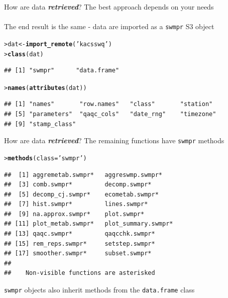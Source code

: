 \documentclass[serif]{beamer}\usepackage[]{graphicx}\usepackage[]{color}
\makeatletter
\newcommand{\hlstr}[1]{\textcolor[rgb]{0.192,0.494,0.8}{#1}}%
\newcommand{\hlstd}[1]{\textcolor[rgb]{0.345,0.345,0.345}{#1}}%
\newcommand{\hlkwb}[1]{\textcolor[rgb]{0.69,0.353,0.396}{#1}}%
\newcommand{\hlkwc}[1]{\textcolor[rgb]{0.333,0.667,0.333}{#1}}%
\newcommand{\hlkwd}[1]{\textcolor[rgb]{0.737,0.353,0.396}{\textbf{#1}}}%
\newenvironment{kframe}{%
 \def\at@end@of@kframe{}%
 \ifinner\ifhmode%
  \def\at@end@of@kframe{\end{minipage}}%
  \begin{minipage}{\columnwidth}%
 \fi\fi%
 \def\FrameCommand##1{\hskip\@totalleftmargin \hskip-\fboxsep
 \colorbox{shadecolor}{##1}\hskip-\fboxsep
     \hskip-\linewidth \hskip-\@totalleftmargin \hskip\columnwidth}%
 \MakeFramed {\advance\hsize-\width
   \@totalleftmargin\z@ \linewidth\hsize
   \@setminipage}}%
 {\par\unskip\endMakeFramed%
 \at@end@of@kframe}
\newenvironment{knitrout}{}{} %
\newcommand{\Bigtxt}[1]{\textbf{\textit{#1}}}
\makeatother
\begin{document}
\begin{frame}[fragile,t]{How are data \Bigtxt{retrieved}?}
The best approach depends on your needs \\~\\
The end result is the same - data are imported as a \texttt{swmpr} S3 object
\begin{knitrout}
\color{fgcolor}\begin{kframe}
\begin{alltt}
\hlstd{> }\hlstd{dat} \hlkwb{<-} \hlkwd{import_remote}\hlstd{(}\hlstr{'kacsswq'}\hlstd{)}
\hlstd{> }\hlkwd{class}\hlstd{(dat)}
\end{alltt}
\begin{verbatim}
## [1] "swmpr"      "data.frame"
\end{verbatim}
\begin{alltt}
\hlstd{> }\hlkwd{names}\hlstd{(}\hlkwd{attributes}\hlstd{(dat))}
\end{alltt}
\begin{verbatim}
## [1] "names"       "row.names"   "class"       "station"    
## [5] "parameters"  "qaqc_cols"   "date_rng"    "timezone"   
## [9] "stamp_class"
\end{verbatim}
\end{kframe}
\end{knitrout}
\end{frame}

\begin{frame}[fragile,t]{How are data \Bigtxt{retrieved}?}
The remaining functions have \texttt{swmpr} methods
\begin{knitrout}\small
{}\color{fgcolor}\begin{kframe}
\begin{alltt}
\hlstd{> }\hlkwd{methods}\hlstd{(}\hlkwc{class} \hlstd{=} \hlstr{'swmpr'}\hlstd{)}
\end{alltt}
\begin{verbatim}
##  [1] aggremetab.swmpr*   aggreswmp.swmpr*   
##  [3] comb.swmpr*         decomp.swmpr*      
##  [5] decomp_cj.swmpr*    ecometab.swmpr*    
##  [7] hist.swmpr*         lines.swmpr*       
##  [9] na.approx.swmpr*    plot.swmpr*        
## [11] plot_metab.swmpr*   plot_summary.swmpr*
## [13] qaqc.swmpr*         qaqcchk.swmpr*     
## [15] rem_reps.swmpr*     setstep.swmpr*     
## [17] smoother.swmpr*     subset.swmpr*      
## 
##    Non-visible functions are asterisked
\end{verbatim}
\end{kframe}
\end{knitrout}
\texttt{swmpr} objects also inherit methods from the \texttt{data.frame} class
\end{frame}
\end{document}
